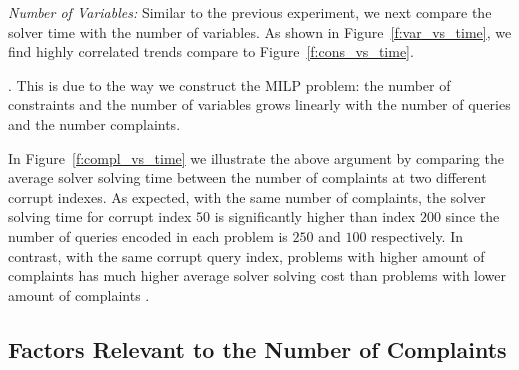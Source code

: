 \smallskip
\emph{Number of Variables: } Similar to the previous experiment, we next compare the solver time with the number of variables. As shown in Figure~\ref{f:var_vs_time}, we find highly correlated trends compare to Figure~\ref{f:cons_vs_time}. 

.
This is due to the way we construct the MILP problem: the number of constraints and the number of variables grows linearly with the number of queries and the number complaints. 

In Figure~\ref{f:compl_vs_time} we illustrate the above argument by comparing the average solver solving time between the number of complaints at two different corrupt indexes.  As expected, with the same number of complaints, the solver solving time for corrupt index $50$ is significantly higher than index $200$ since the number of queries encoded in each problem is $250$ and $100$ respectively. In contrast, with the same corrupt query index, problems with higher amount of complaints has much higher average solver solving cost than problems with lower amount of complaints . 

\subsection{Factors Relevant to the Number of Complaints}

